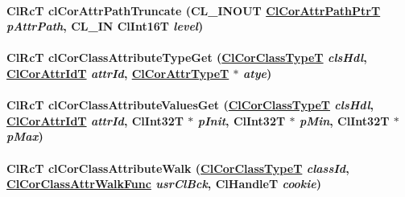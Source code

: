 \hypertarget{group__group13_ga133}{
\paragraph[clCorAttrPathTruncate]{\setlength{\rightskip}{0pt plus 5cm}Cl\-Rc\-T cl\-Cor\-Attr\-Path\-Truncate (CL\_\-INOUT \hyperlink{struct_cl_cor_attr_path}{Cl\-Cor\-Attr\-Path\-Ptr\-T} {\em p\-Attr\-Path}, CL\_\-IN Cl\-Int16T {\em level})}\hfill}
\label{group__group13_ga133}


\hypertarget{group__group13_ga93}{
\paragraph[clCorClassAttributeTypeGet]{\setlength{\rightskip}{0pt plus 5cm}Cl\-Rc\-T cl\-Cor\-Class\-Attribute\-Type\-Get (\hyperlink{group__group13_ga2}{Cl\-Cor\-Class\-Type\-T} {\em cls\-Hdl}, \hyperlink{group__group13_ga3}{Cl\-Cor\-Attr\-Id\-T} {\em attr\-Id}, \hyperlink{group__group13_ga10}{Cl\-Cor\-Attr\-Type\-T} $\ast$ {\em atye})}\hfill}
\label{group__group13_ga93}


\hypertarget{group__group13_ga94}{
\paragraph[clCorClassAttributeValuesGet]{\setlength{\rightskip}{0pt plus 5cm}Cl\-Rc\-T cl\-Cor\-Class\-Attribute\-Values\-Get (\hyperlink{group__group13_ga2}{Cl\-Cor\-Class\-Type\-T} {\em cls\-Hdl}, \hyperlink{group__group13_ga3}{Cl\-Cor\-Attr\-Id\-T} {\em attr\-Id}, Cl\-Int32T $\ast$ {\em p\-Init}, Cl\-Int32T $\ast$ {\em p\-Min}, Cl\-Int32T $\ast$ {\em p\-Max})}\hfill}
\label{group__group13_ga94}


\hypertarget{group__group13_ga92}{
\paragraph[clCorClassAttributeWalk]{\setlength{\rightskip}{0pt plus 5cm}Cl\-Rc\-T cl\-Cor\-Class\-Attribute\-Walk (\hyperlink{group__group13_ga2}{Cl\-Cor\-Class\-Type\-T} {\em class\-Id}, \hyperlink{group__group13_ga14}{Cl\-Cor\-Class\-Attr\-Walk\-Func} {\em usr\-Cl\-Bck}, Cl\-Handle\-T {\em cookie})}\hfill}
\label{group__group13_ga92}


